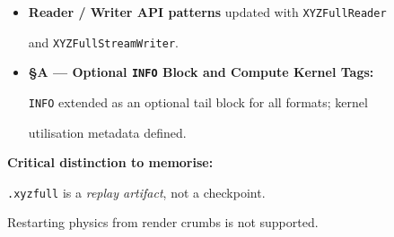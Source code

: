 \documentclass[12pt, a4paper, oneside]{article}
\begin{document}
\begin{tcolorbox}
\begin{tcolorbox}[

  colback=white, colframe=rulegray,

  boxrule=0.6pt, arc=2pt, left=4pt, right=4pt, top=4pt, bottom=4pt

]
\begin{itemize}
  \item \textbf{Reader / Writer API patterns} updated with \texttt{XYZFullReader}

        and \texttt{XYZFullStreamWriter}.

  \item \textbf{\S{}A --- Optional \texttt{INFO} Block and Compute Kernel Tags:}

        \texttt{INFO} extended as an optional tail block for all formats; kernel

        utilisation metadata defined.

\end{itemize}

\end{tcolorbox}


\medskip

\begin{tcolorbox}[

  colback=warnredlight, colframe=warnred,

  boxrule=0.6pt, arc=2pt, left=4pt, right=4pt, top=4pt, bottom=4pt

]

\textbf{\color{warnred}Critical distinction to memorise:}

\texttt{.xyzfull} is a \emph{replay artifact}, not a checkpoint.

Restarting physics from render crumbs is not supported.

\end{tcolorbox}


\end{tcolorbox}


\bigskip





\newpage

\thispagestyle{fancy}
\end{document}
